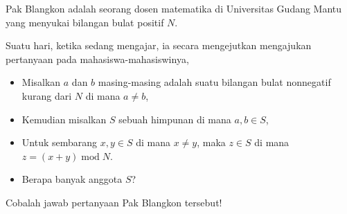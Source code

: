 Pak Blangkon adalah seorang dosen matematika di Universitas Gudang Mantu yang menyukai bilangan bulat positif $N$.

Suatu hari, ketika sedang mengajar, ia secara mengejutkan mengajukan pertanyaan pada mahasiswa-mahasiswinya, 
\begin{itemize}
\item Misalkan $a$ dan $b$ masing-masing adalah suatu bilangan bulat nonnegatif kurang dari $N$ di mana $a \neq b$,
\item Kemudian misalkan $S$ sebuah himpunan di mana $a,b\in{S}$,
\item Untuk sembarang $x,y \in S$ di mana $x \neq y$, maka $z\in S$ di mana $z=(x+y)\operatorname{mod}N$.
\item Berapa banyak anggota $S$?
\end{itemize}

Cobalah jawab pertanyaan Pak Blangkon tersebut!
